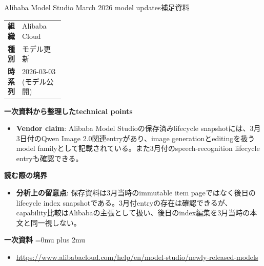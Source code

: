 \begin{technicalnote}{Alibaba Model Studio March 2026 model updates}{補足資料}
\begingroup
\begin{tabularx}{\linewidth}{@{}>{\bfseries}p{0.22\linewidth}X@{}}
組織 & Alibaba Cloud \\
種別 & モデル更新 \\
時系列 & 2026-03-03 (モデル公開) \\
\end{tabularx}
\smallskip
{\bfseries 一次資料から整理したtechnical points}
\begin{itemize}[leftmargin=1.5em,itemsep=0.35em]
\item \textbf{Vendor claim}: Alibaba Model Studioの保存済みlifecycle snapshotには、3月3日付のQwen Image 2.0関連entryがあり、image generationとeditingを扱うmodel familyとして記載されている。また3月付のspeech-recognition lifecycle entryも確認できる。
\end{itemize}
\begin{minipage}{\linewidth}
{\bfseries 読む際の境界}
\begin{itemize}[leftmargin=1.5em,itemsep=0.35em]
\item \textbf{分析上の留意点}: 保存資料は3月当時のimmutable item pageではなく後日のlifecycle index snapshotである。3月付entryの存在は確認できるが、capability比較はAlibabaの主張として扱い、後日のindex編集を3月当時の本文と同一視しない。
\end{itemize}
\begin{samepage}
{\bfseries 一次資料}
\begingroup\sloppy
\Urlmuskip=0mu plus 2mu\relax
\begin{itemize}[leftmargin=1.5em,itemsep=0.25em]
\item {\scriptsize\url{https://www.alibabacloud.com/help/en/model-studio/newly-released-models}}
\end{itemize}
\endgroup
\end{samepage}
\end{minipage}
\endgroup
\end{technicalnote}
\medskip
